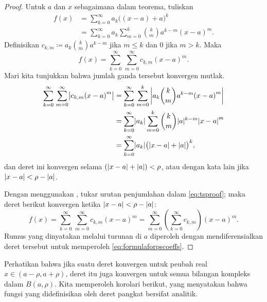 \begin{proof}
Untuk $a$ dan $x$ sebagaimana dalam teorema,
tuliskan
\begin{equation*}
\begin{split}
f(x) &= \sum_{k=0}^\infty a_k {\bigl((x-a)+a\bigr)}^k \\
&= \sum_{k=0}^\infty a_k \sum_{m=0}^k \binom{k}{m} a^{k-m} {(x-a)}^m .
\end{split}
\end{equation*}
Definisikan $c_{k,m} \coloneqq a_k \binom{k}{m} a^{k-m}$ jika $m \leq k$ dan $0$ jika $m >
k$.  Maka
\begin{equation} \label{eq:tsproof}
f(x) = \sum_{k=0}^\infty \, \sum_{m=0}^\infty c_{k,m} {(x-a)}^m .
\end{equation}
Mari kita tunjukkan bahwa jumlah ganda tersebut konvergen mutlak.
\begin{equation*}
\begin{split}
\sum_{k=0}^\infty \, \sum_{m=0}^\infty \bigl\lvert { c_{k,m} {(x-a)}^m} \bigr\rvert
& = \sum_{k=0}^\infty \, \sum_{m=0}^k \left\lvert { a_k \binom{k}{m} a^{k-m} {(x-a)}^m } \right\rvert
\\
& = \sum_{k=0}^\infty \lvert {a_k} \rvert \sum_{m=0}^k \binom{k}{m} \lvert {a} \rvert^{k-m}
{\lvert {x-a} \rvert}^m  \\
& = \sum_{k=0}^\infty \lvert {a_k} \rvert {\bigl(\lvert {x-a} \rvert+\lvert {a} \rvert\bigr)}^k ,
\end{split}
\end{equation*}
dan deret ini konvergen selama
$(\lvert {x-a} \rvert+\lvert {a} \rvert) < \rho$, atau dengan kata lain jika
$\lvert {x-a} \rvert < \rho-\lvert {a} \rvert$.

Dengan menggunakan ,
tukar urutan penjumlahan dalam \eqref{eq:tsproof}; maka
deret berikut konvergen ketika $\lvert {x-a} \rvert < \rho-\lvert {a} \rvert$:
\begin{equation*}
f(x) =
\sum_{k=0}^\infty \, \sum_{m=0}^\infty c_{k,m} {(x-a)}^m
=
\sum_{m=0}^\infty
\left( \sum_{k=0}^\infty
c_{k,m} \right) {(x-a)}^m .
\end{equation*}
Rumus yang dinyatakan melalui turunan di $a$ diperoleh dengan
mendiferensialkan deret tersebut untuk memperoleh \eqref{eq:formulaforpscoeffs}.
\end{proof}

Perhatikan bahwa jika suatu deret konvergen untuk peubah real $x \in (a-\rho,a+\rho)$, deret itu juga konvergen
untuk semua bilangan kompleks dalam $B(a,\rho)$.
Kita memperoleh korolari berikut, yang menyatakan bahwa fungsi yang didefinisikan
oleh deret pangkat bersifat analitik.

